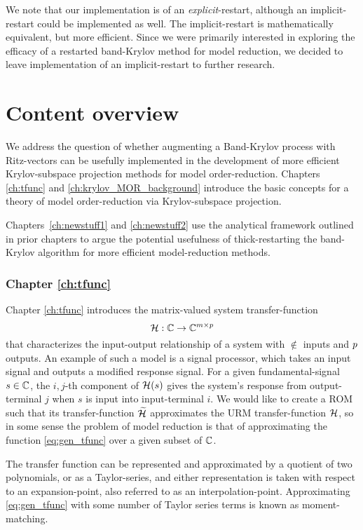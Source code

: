 We note that our implementation is of an \emph{explicit}-restart, although an implicit-restart could be implemented as well.   The implicit-restart is mathematically equivalent, but more efficient.   Since we were primarily interested in exploring the efficacy of a restarted band-Krylov method for model reduction, we decided to leave implementation of an implicit-restart to further research. 

\section{Content overview}
We  address the question of whether augmenting a Band-Krylov process with Ritz-vectors can be usefully implemented  in the development of more efficient Krylov-subspace projection methods for model order-reduction. Chapters \ref{ch:tfunc} and \ref{ch:krylov_MOR_background} introduce the basic concepts for a theory of model order-reduction via Krylov-subspace projection.     

 Chapters~\ref{ch:newstuff1}  and \ref{ch:newstuff2} use the analytical framework outlined in prior chapters to argue the potential usefulness of thick-restarting the  band-Krylov algorithm for more efficient model-reduction methods.

\subsubsection{Chapter \ref{ch:tfunc}}
Chapter \ref{ch:tfunc} introduces the matrix-valued system transfer-function
\begin{equation}
\mathcal{H}:\mathbb{C} \rightarrow \mathbb{C}^{m \times p}
\label{eq:gen_tfunc}
\end{equation}
that characterizes the input-output relationship of a system with $\nin$ inputs and $p$ outputs.  An example of such a model is a signal processor, which takes an input signal and outputs a modified response signal.   For a given fundamental-signal $s\in\mathbb{C}$,  the $i,j$-th component of $\mathcal{H}(s)$  gives the system's response from output-terminal $j$ when $s$ is input into input-terminal $i$.  We would like to create a ROM such that its transfer-function $\widetilde{\mathcal{H}}$ approximates the URM transfer-function $\mathcal{H}$, so in some sense the problem of model reduction is that of approximating the function  \eqref{eq:gen_tfunc} over a given subset of $\mathbb{C}$.

The transfer function can be represented and approximated by a quotient of two polynomials, or as a Taylor-series, and either representation is taken with respect to an expansion-point, also referred to as an interpolation-point.     Approximating \eqref{eq:gen_tfunc} with some number of Taylor series terms is known as moment-matching. 


